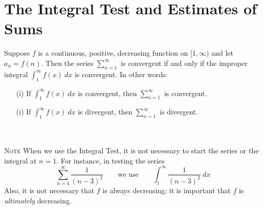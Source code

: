 \section{The Integral Test and Estimates of Sums}
  \begin{definition}
    Suppose $f$ is a continuous, positive, decreasing function on $[1,\infty)$ and let $a_n=f(n)$. Then the series $\sum_{n=1}^{\infty}$ is convergent if and only if the improper integral $\int_{1}^{\infty} f(x)\ dx$ is convergent. In other words:
    \begin{enumerate}
      \item[(i)] If $\displaystyle\int_{1}^{\infty} f(x)\ dx$ is convergent, then $\displaystyle\sum_{n=1}^{\infty}$ is convergent.
      \item[(i)] If $\displaystyle\int_{1}^{\infty} f(x)\ dx$ is divergent, then $\displaystyle\sum_{n=1}^{\infty}$ is divergent.
    \end{enumerate}
  \end{definition}
  \hphantom{ }\\~\\
  \textsc{Note} When we use the Integral Test, it is not necessary to start the series or the integral at $n=1$. For instance, in testing the series
  $$\sum_{n=4}^{\infty} \frac{1}{(n-3)^2} \qquad \text{we use} \qquad \int_{1}^{\infty}  \frac{1}{(n-3)^2}\ dx$$
  Also, it is not necessary that $f$ is always decreasing; it is important that $f$ is \textit{ultimately} decreasing.
